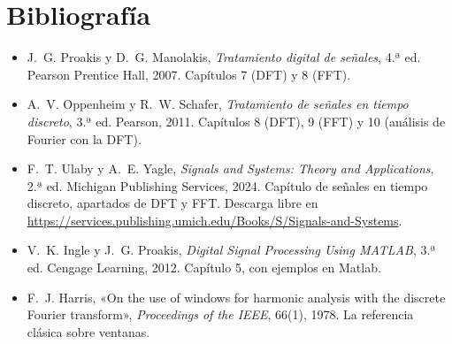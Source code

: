 \documentclass[11pt,a4paper]{scrartcl}
\begin{document}
\section*{Bibliografía}

\begin{itemize}
  \item J.~G. Proakis y D.~G. Manolakis, \emph{Tratamiento digital de señales}, 4.ª ed. Pearson Prentice Hall, 2007. Capítulos 7 (DFT) y 8 (FFT).
  \item A.~V. Oppenheim y R.~W. Schafer, \emph{Tratamiento de señales en tiempo discreto}, 3.ª ed. Pearson, 2011. Capítulos 8 (DFT), 9 (FFT) y 10 (análisis de Fourier con la DFT).
  \item F.~T. Ulaby y A.~E. Yagle, \emph{Signals and Systems: Theory and Applications}, 2.ª ed. Michigan Publishing Services, 2024. Capítulo de señales en tiempo discreto, apartados de DFT y FFT. Descarga libre en\\ \url{https://services.publishing.umich.edu/Books/S/Signals-and-Systems}.
  \item V.~K. Ingle y J.~G. Proakis, \emph{Digital Signal Processing Using MATLAB}, 3.ª ed. Cengage Learning, 2012. Capítulo 5, con ejemplos en Matlab.
  \item F.~J. Harris, «On the use of windows for harmonic analysis with the discrete Fourier transform», \emph{Proceedings of the IEEE}, 66(1), 1978. La referencia clásica sobre ventanas.
\end{itemize}
\end{document}
